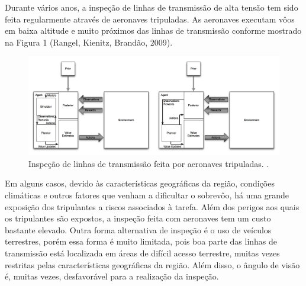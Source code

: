 Durante vários anos, a inspeção de linhas de transmissão de alta tensão tem sido feita regularmente através de aeronaves tripuladas. As aeronaves executam vôos em baixa altitude e muito próximos das linhas de transmissão conforme mostrado na  Figura 1 (Rangel, Kienitz, Brandão, 2009).
\begin{figure} [h!]												%
	\centering													%
	\includegraphics[width=1.0\textwidth]{./asmuth}				%
	\caption{Inspeção de linhas de transmissão feita por aeronaves tripuladas. \cite{asm:13}.}			%
	\label{asmuth}												%
\end{figure}													%

Em alguns casos, devido às características geográficas da região, condições climáticas e outros fatores que venham a dificultar o sobrevôo, há uma grande exposição dos tripulantes a riscos associados à tarefa. Além dos perigos aos quais os tripulantes são expostos, a inspeção feita com aeronaves tem um custo bastante elevado. Outra forma alternativa de inspeção é o uso de veículos terrestres, porém essa forma é muito limitada, pois boa parte das linhas de transmissão está localizada em áreas de difícil acesso terrestre, muitas vezes restritas pelas características geográficas da região. Além disso, o ângulo de visão é, muitas vezes, desfavorável para a realização da inspeção.

